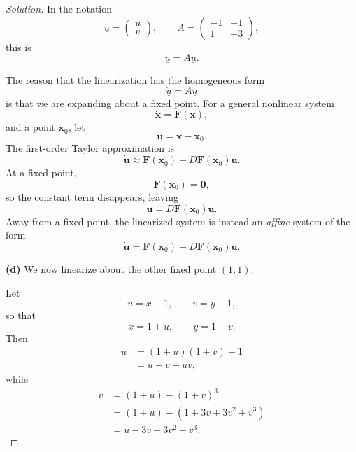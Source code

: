\documentclass[12pt]{amsart}
\theoremstyle{conjecture}
\theoremstyle{definition}
\theoremstyle{question}
\theoremstyle{theorem}
\newenvironment{solution}
{\begin{proof}[Solution]}
{\end{proof}}
\begin{document}
\begin{solution}
        In the notation
        \[
            \underline{u}
            =
            \begin{pmatrix}
                u\\
                v
            \end{pmatrix},
            \qquad
            A=
            \begin{pmatrix}
                -1 & -1\\
                1 & -3
            \end{pmatrix},
        \]
        this is
        \[
            \boxed{\underline{\dot{u}}=A\underline{u}.}
        \]

        The reason that the linearization has the homogeneous form
        \[
            \underline{\dot{u}}=A\underline{u}
        \]
        is that we are expanding about a fixed point.  For a general nonlinear
        system
        \[
            \dot{\mathbf{x}}=\mathbf{F}(\mathbf{x}),
        \]
        and a point $\mathbf{x}_0$, let
        \[
            \mathbf{u}=\mathbf{x}-\mathbf{x}_0.
        \]
        The first-order Taylor approximation is
        \[
            \dot{\mathbf{u}}
            \approx
            \mathbf{F}(\mathbf{x}_0)
            +
            D\mathbf{F}(\mathbf{x}_0)\mathbf{u}.
        \]
        At a fixed point,
        \[
            \mathbf{F}(\mathbf{x}_0)=\mathbf{0},
        \]
        so the constant term disappears, leaving
        \[
            \dot{\mathbf{u}}
            =
            D\mathbf{F}(\mathbf{x}_0)\mathbf{u}.
        \]
        Away from a fixed point, the linearized system is instead an
        \emph{affine} system of the form
        \[
            \boxed{
                \dot{\mathbf{u}}
                =
                \mathbf{F}(\mathbf{x}_0)
                +
                D\mathbf{F}(\mathbf{x}_0)\mathbf{u}.}
        \]

        \bigskip

        \textbf{(d)} We now linearize about the other fixed point $(1,1)$.

        Let
        \[
            u=x-1,
            \qquad
            v=y-1,
        \]
        so that
        \[
            x=1+u,
            \qquad
            y=1+v.
        \]
        Then
        \begin{align*}
            \dot{u}
            &=(1+u)(1+v)-1\\
            &=u+v+uv,
        \end{align*}
        while
        \begin{align*}
            \dot{v}
            &=(1+u)-(1+v)^3\\
            &=(1+u)-(1+3v+3v^2+v^3)\\
            &=u-3v-3v^2-v^3.
        \end{align*}


\end{solution}
\end{document}
